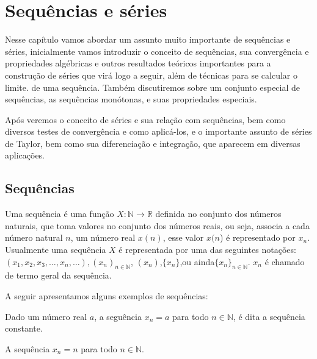 
\chapter{Sequências e séries}\label{cap:seq_series}

\emconstrucao

Nesse capítulo vamos abordar um assunto muito importante de sequências e séries,
inicialmente vamos introduzir o conceito de sequências, sua convergência e
propriedades algébricas e outros resultados teóricos importantes para a 
construção de séries que virá logo a seguir, além de técnicas para se calcular o limite.
de uma sequência. Também discutiremos sobre um conjunto especial de sequências, as sequências
monótonas, e suas propriedades especiais.

Após veremos o conceito de séries e sua relação com sequências, bem como 
diversos testes de convergência e como aplicá-los, e o importante assunto de 
séries de Taylor, bem como sua diferenciação e integração, que aparecem em 
diversas aplicações.

\section{Sequências}
\construirSec

Uma sequência é uma função $X:\mathbb{N} \rightarrow \mathbb{R}$ definida no 
conjunto dos números naturais, que toma valores no conjunto dos números reais, 
ou seja, associa a cada número natural $n$, um número real $x(n)$, esse valor 
$x(n$) é representado por $x_n$. Usualmente uma sequência $X$ é representada 
por uma das seguintes notações: $(x_1,x_2,x_3,\dots,x_n,\dots),
(x_n)_{n \in \mathbb{N}}$, $(x_n)$,$\{x_n\}$,ou ainda$\{x_n\}_{n \in \mathbb{N}}$.
$x_n$ é chamado de termo geral da sequência.

A seguir apresentamos alguns exemplos de sequências:
\begin{ex}\label{ex: 1}
Dado um número real $a$, a seguência $x_n = a$ para todo $n \in \mathbb{N}$,
é dita a sequência constante.
\end{ex}

\begin{ex}\label{ex: 2}
A sequência $x_n = n$ para todo $n \in \mathbb{N}$.
\end{ex}

